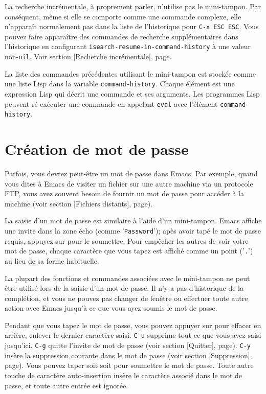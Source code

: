 La recherche incrémentale, à proprement parler, n'utilise pas le
mini-tampon. Par conséquent, même si elle se comporte comme une
commande complexe, elle n'apparaît normalement pas dans la liste de
l'historique pour \texttt{C-x ESC ESC}. Vous pouvez faire apparaître des
commandes de recherche supplémentaires dans l'historique en
configurant \texttt{isearch-resume-in-command-history} à une valeur
non-\texttt{nil}. Voir section [Recherche incrémentale],
page.

La liste des commandes précédentes utilisant le mini-tampon est
stockée comme une liste Lisp dans la variable
\texttt{command-history}. Chaque élément est une expression Lisp qui
décrit une commande et ses arguments. Les programmes Lisp peuvent
ré-exécuter une commande en appelant \texttt{eval} avec l'élément
\texttt{command-history}. 

\section{Création de mot de passe}

Parfois, vous devrez peut-être un mot de passe dans Emacs. Par
exemple, quand vous dites à Emacs de visiter un fichier sur une autre
machine via un protocole FTP, vous avez souvent besoin de fournir un
mot de passe pour accéder à la machine (voir section
[Fichiers distants], page).

La saisie d'un mot de passe est similaire à l'aide d'un
mini-tampon. Emacs affiche une invite dans la zone écho (comme
'\texttt{Password}'); apès avoir tapé le mot de passe requis, appuyez
sur \RET pour le soumettre. Pour empêcher les autres de voir votre mot
de passe, chaque caractère que vous tapez est affiché comme un point
('\texttt{.}') au lieu de sa forme habituelle.

La plupart des fonctions et commandes associées avec le mini-tampon ne
peut être utilisé lors de la saisie d'un mot de passe. Il n'y a pas
d'historique de la complétion, et vous ne pouvez pas changer de
fenêtre ou effectuer toute autre action avec Emacs jusqu'à ce que vous
ayez soumis le mot de passe.

Pendant que vous tapez le mot de passe, vous pouvez appuyer sur \DEL
pour effacer en arrière, enlever le dernier caractère
saisi. \texttt{C-u} supprime tout ce que vous avez saisi
jusqu'ici. \texttt{C-g} quitte l'invite de mot de passe (voir
section [Quitter], page). \texttt{C-y}
insère la suppression courante dans le mot de passe (voir
section [Suppression], page). Vous pouvez taper soit
\RET soit \ESC pour soumettre le mot de passe. Toute autre touche de
caractère auto-insertion insère le caractère associé dans le mot de
passe, et toute autre entrée est ignorée. 


